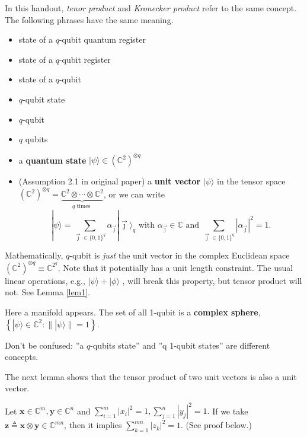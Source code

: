 In this handout, \textit{tenor product} and \textit{Kronecker product} refer to the same concept. The following phrases have the same meaning.
\begin{itemize}
    \item state of a $q$-qubit quantum register
    \item state of a $q$-qubit register
    \item state of a $q$-qubit
    \item $q$-qubit state
    \item $q$-qubit
    \item $q$ qubits
    \item a \textbf{quantum state} $|\psi\rangle \in\left(\mathbb{C}^2\right)^{\otimes q}$
    \item (Assumption 2.1 in original paper) a \textbf{unit vector} $|\psi\rangle$ in the tensor space $\left(\mathbb{C}^2\right)^{\otimes q}=\underbrace{\mathbb{C}^2 \otimes \cdots \otimes \mathbb{C}^2}_{q \text { times }}$, or we can write
    \begin{equation*}
        |\psi\rangle=\sum_{\vec{\jmath} \in\{0,1\}^q} \alpha_{\vec{\jmath}}|\vec{\jmath}\rangle_q \text { with } \alpha_{\vec{\jmath}} \in \mathbb{C} \text { and } \sum_{\vec{\jmath} \in\{0,1\}^q}\left|\alpha_{\vec{\jmath}}\right|^2=1.
    \end{equation*}
    
\end{itemize}

\begin{remark}
    Mathematically, $q$-qubit is \textit{just} the unit vector in the complex Euclidean space $\left(\mathbb{C}^2\right)^{\otimes q} \equiv \mathbb{C}^{2^q} $. Note that it potentially has a unit length constraint. The usual linear operations, e.g., $|\psi\rangle + |\phi\rangle$ , will break this property, but tensor product will not. See Lemma \ref{lem1}.
\end{remark}

\begin{remark}
    Here a manifold appears. The set of all 1-qubit is a \textbf{complex sphere}, $\left\{|\psi\rangle \in \mathbb{C}^{2}:\||\psi\rangle\|=1\right\}$.
\end{remark}

\begin{remark}
    Don't be confused: ''a $q$-qubits state'' and ''q 1-qubit states'' are different concepts.
\end{remark}


The next lemma shows that the tensor product of two unit vectors is also a unit vector.
\begin{lemma}\label{lem1}
 Let $\mathbf{x} \in \mathbb{C}^m,\mathbf{y} \in \mathbb{C}^n$ and $ \sum_{i=1}^m\left|x_i\right|^2=1, \sum_{j=1}^n\left|y_j\right|^2=1.$ 
 If we take
 $ \mathbf{z} \triangleq \mathbf{x} \otimes \mathbf{y}\in\mathbb{C}^{mn}$, then it implies $\sum_{k=1}^{mn}\left|z_k\right|^2=1$. (See proof below.)
\end{lemma}


